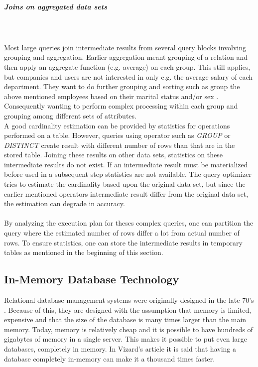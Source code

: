 \documentclass{cslthse-msc}
\begin{document}
\subparagraph{Joins on aggregated data sets}\mbox{}\\\\
Most large queries join intermediate results from several query blocks involving grouping and aggregation. Earlier aggregation meant grouping of a relation and then apply an aggregate function (e.g. average) on each group. This still applies, but companies and users are not interested in only e.g. the average salary of each department. They want to do further grouping and sorting such as group the above mentioned employees based on their marital status and/or sex   \cite{partioned}. Consequently wanting to perform complex processing within each group and grouping among different sets of attributes.\\ A good cardinality estimation can be provided by statistics for operations performed on a table. However, queries using operator such as \textit{GROUP} or \textit{DISTINCT} create result with different number of rows than that are in the stored table. Joining these results on other data sets, statistics on these intermediate results do not exist. If an intermediate result must be materialized before used in a subsequent step statistics are not available. The query optimizer tries to estimate the cardinality based upon the original data set, but since the earlier mentioned operators intermediate result differ from the original data set, the estimation can degrade in accuracy.\\\\ By analyzing the execution plan for theses complex queries, one can partition the query where the estimated number of rows differ a lot from actual number of rows. To ensure statistics, one can store the intermediate results in temporary tables as mentioned in the beginning of this section.     

 
\subsection{In-Memory Database Technology}
Relational database management systems were originally designed in the late 70's   \cite{Nevarez}. Because of this, they are designed with the assumption that memory is limited, expensive and that the size of the database is many times larger than the main memory. Today, memory is relatively cheap and it is possible to have hundreds of gigabytes of memory in a single server. This makes it possible to put even large databases, completely in memory. In Vizard's article   \cite{Vizard12} it is said that having a database completely in-memory can make it a thousand times faster.
\end{document}
